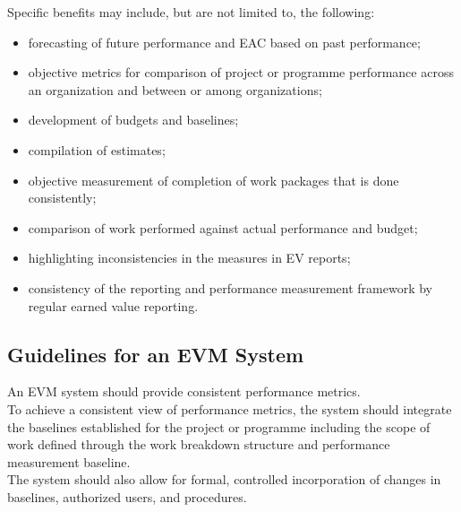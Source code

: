 \documentclass[letterpaper,10pt,english]{jupyterBook}
\begin{document}
\sphinxAtStartPar
Specific benefits may include, but are not limited to, the following:
\begin{itemize}
\item {} 
\sphinxAtStartPar
forecasting of future performance and EAC based on past performance;

\item {} 
\sphinxAtStartPar
objective metrics for comparison of project or programme performance across an organization and between or among organizations;

\item {} 
\sphinxAtStartPar
development of budgets and baselines;

\item {} 
\sphinxAtStartPar
compilation of estimates;

\item {} 
\sphinxAtStartPar
objective measurement of completion of work packages that is done consistently;

\item {} 
\sphinxAtStartPar
comparison of work performed against actual performance and budget;

\item {} 
\sphinxAtStartPar
highlighting inconsistencies in the measures in EV reports;

\item {} 
\sphinxAtStartPar
consistency of the reporting and performance measurement framework by regular earned value reporting.

\end{itemize}


\subsection{Guidelines for an EVM System}
\label{\detokenize{PM/evm:guidelines-for-an-evm-system}}
\sphinxAtStartPar
An EVM  system should provide consistent performance metrics. \\
To achieve a consistent view of performance metrics, the system should integrate the baselines established for the project or programme including the scope of work defined through the work breakdown structure and performance measurement baseline. \\
The system should also allow for formal, controlled incorporation of changes in baselines, authorized users, and procedures.
\end{document}

